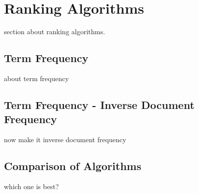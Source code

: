 \section{Ranking Algorithms}
section about ranking algorithms.

\subsection{Term Frequency}
about term frequency

\subsection{Term Frequency - Inverse Document Frequency}
now make it inverse document frequency


\subsection{Comparison of Algorithms}
which one is best?